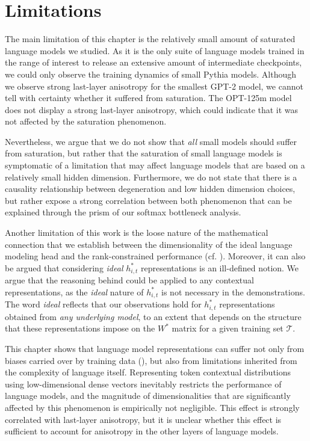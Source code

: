 \section*{Limitations}
The main limitation of this chapter is the relatively small amount of saturated language models we studied. As it is the only suite of language models trained in the range of interest to release an extensive amount of intermediate checkpoints, we could only observe the training dynamics of small Pythia models. Although we observe strong last-layer anisotropy for the smallest GPT-2 model, we cannot tell with certainty whether it suffered from saturation. The OPT-125m model does not display a strong last-layer anisotropy, which could indicate that it was not affected by the saturation phenomenon.

Nevertheless, we argue that we do not show that \textit{all} small models should suffer from saturation, but rather that the saturation of small language models is symptomatic of a limitation that may affect language models that are based on a relatively small hidden dimension. Furthermore, we do not state that there is a causality relationship between degeneration and low hidden dimension choices, but rather expose a strong correlation between both phenomenon that can be explained through the prism of our softmax bottleneck analysis.


Another limitation of this work is the loose nature of the mathematical connection that we establish between the dimensionality of the ideal language modeling head and the rank-constrained performance (cf. ). Moreover, it can also be argued that considering \textit{ideal} $h_{i,t}^*$ representations is an ill-defined notion. We argue that the reasoning behind  could be applied to any contextual representations, as the \textit{ideal} nature of $h_{i,t}^*$ is not necessary in the demonstrations. The word \textit{ideal} reflects that our observations hold for $h_{i,t}^*$ representations obtained from \textit{any underlying model}, to an extent that depends on the structure that these representations impose on the $W^*$ matrix for a given training set $\mathcal{T}$.


\vspace{2em}

This chapter shows that language model representations can suffer not only from biases carried over by training data (), but also from limitations inherited from the complexity of language itself. Representing token contextual distributions using low-dimensional dense vectors inevitably restricts the performance of language models, and the magnitude of dimensionalities that are significantly affected by this phenomenon is empirically not negligible. This effect is strongly correlated with last-layer anisotropy, but it is unclear whether this effect is sufficient to account for anisotropy in the other layers of language models.


